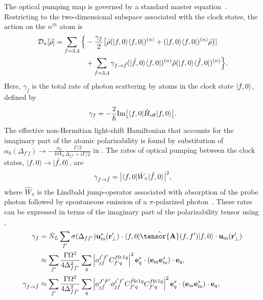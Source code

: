 \documentclass[preprint, aps,pra,onecolumn]{revtex4-1} %
\newcommand{\inp}{{\rm in}}
\newcommand{\charpol}{\alpha_0(\Delta_{f'f})}
\begin{document}
The optical pumping map is governed by a standard master equation~\cite{deutsch_quantum_2010}.  
Restricting to the two-dimensional subspace associated with the clock states, the action on the $n^{th}$ atom is
	\begin{align}
		\mathcal{D}_n[\hat{\rho}] =  \sum_{f=3,4} \Big\{& -\frac{\gamma_{f}}{2} \big[ \hat{\rho} (\lvert{f,0}\rangle\langle{f,0}\rvert)^{(n)} + (\lvert{f,0}\rangle\langle{f,0}\rvert)^{(n)}\hat{\rho} \big)]\\
		&+  \sum_{\tilde{f} =3,4}  \gamma_{f \rightarrow \tilde{f}}(\lvert{\tilde{f},0}\rangle\langle{f,0}\rvert)^{(n)} \hat{\rho}(\lvert{f,0}\rangle\langle{\tilde{f},0}\rvert)^{(n)} \Big\}.\nonumber
	\end{align}
Here, $\gamma_{f}$ is the total rate of photon scattering by atoms in the clock state $\lvert{f,0}\rangle$, defined by
	\begin{equation}
		\gamma_{f}=- \frac{2}{\hbar} {\rm Im} \big[ \langle{f,0}\rvert \hat{H}_{\rm eff}\lvert{f,0}\rangle \big] .
	\end{equation}
The effective non-Hermitian light-shift Hamiltonian that accounts for the imaginary part of the atomic polarizability is found by substitution of $\charpol \rightarrow -\frac{\sigma_0}{4\pi k_0}\frac{\Gamma/2}{\Delta_{ff'}+i\Gamma/2}$ in .  The rates of optical pumping between the clock states, $\lvert{f,0}\rangle \rightarrow \lvert{\tilde{f},0}\rangle$, are
	\begin{equation}
		\gamma_{f \rightarrow \tilde{f} } =\big| \langle{f,0}\rvert \hat{W}_\pi \lvert{\tilde{f},0}\rangle \big|^2,
	\end{equation}
where $\hat{W}_\pi$ is the Lindbald jump-operator associated with absorption of the probe photon followed by spontaneous emission of a $\pi$-polarized photon~\cite{deutsch_quantum_2010}.  These rates can be expressed in terms of the imaginary part of the polarizability tensor using ,
	\begin{align}
		\gamma_f &=\dot{N}_L  \sum_{f'} \sigma (\Delta_{ff'} ) \mathbf{u}^*_\inp(\br'_\perp)\cdot \bra{f,0} \hat{\tensor{\mbf{A}}}(f,f') \ket{f,0}  \cdot \mathbf{u}_\inp(\br'_\perp)\nonumber\\
		&\approx \sum_{f'} \frac{\Gamma\Omega^2}{4\Delta_{ff'}^2}\sum_q \left| o_{jf}^{j'f'}C_{f'q}^{f0;1 q}\right|^2 \mathbf{e}_q^* \cdot (\mathbf{e}_{\rm in}\mathbf{e}_{\rm in}^* )\cdot \mathbf{e}_q , \\
		\gamma_{f \rightarrow \tilde{f}}
		&\approx \sum_{f'} \frac{\Gamma\Omega^2}{4\Delta_{ff'}^2}\sum_q \left| o_{j\tilde{f}}^{J'F'} o_{jf}^{j'f'}C_{f'q}^{\tilde{f}0;1 q}C_{f'q}^{f0;1q}\right|^2 \mathbf{e}_q^* \cdot (\mathbf{e}_{\rm in}\mathbf{e}_{\rm in}^* )\cdot \mathbf{e}_q,
	\end{align}
\end{document}
